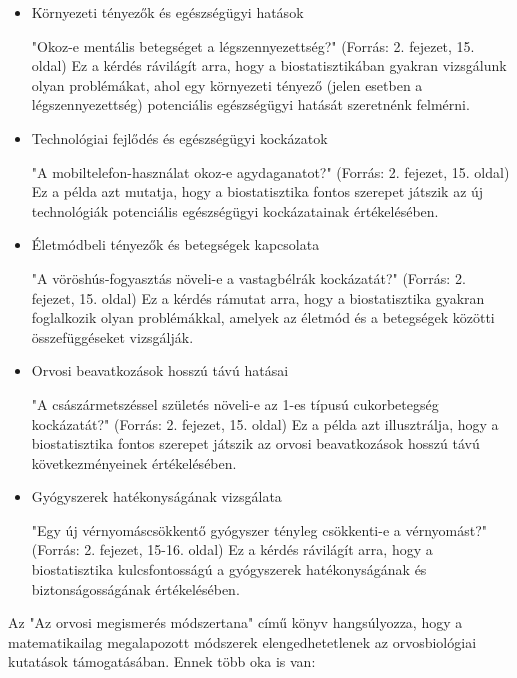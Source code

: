 \documentclass[a4paper,12pt]{article}
\begin{document}
    \begin{itemize}
        \item Környezeti tényezők és egészségügyi hatások

        "Okoz-e mentális betegséget a légszennyezettség?" (Forrás: 2. fejezet, 15. oldal) Ez a kérdés rávilágít arra, hogy a biostatisztikában gyakran vizsgálunk olyan problémákat, ahol egy környezeti tényező (jelen esetben a légszennyezettség) potenciális egészségügyi hatását szeretnénk felmérni.

        \item Technológiai fejlődés és egészségügyi kockázatok

        "A mobiltelefon-használat okoz-e agydaganatot?" (Forrás: 2. fejezet, 15. oldal) Ez a példa azt mutatja, hogy a biostatisztika fontos szerepet játszik az új technológiák potenciális egészségügyi kockázatainak értékelésében.

        \item Életmódbeli tényezők és betegségek kapcsolata

        "A vöröshús-fogyasztás növeli-e a vastagbélrák kockázatát?" (Forrás: 2. fejezet, 15. oldal) Ez a kérdés rámutat arra, hogy a biostatisztika gyakran foglalkozik olyan problémákkal, amelyek az életmód és a betegségek közötti összefüggéseket vizsgálják.

        \item Orvosi beavatkozások hosszú távú hatásai

        "A császármetszéssel születés növeli-e az 1-es típusú cukorbetegség kockázatát?" (Forrás: 2. fejezet, 15. oldal) Ez a példa azt illusztrálja, hogy a biostatisztika fontos szerepet játszik az orvosi beavatkozások hosszú távú következményeinek értékelésében.


        \item Gyógyszerek hatékonyságának vizsgálata

        "Egy új vérnyomáscsökkentő gyógyszer tényleg csökkenti-e a vérnyomást?" (Forrás: 2. fejezet, 15-16. oldal) Ez a kérdés rávilágít arra, hogy a biostatisztika kulcsfontosságú a gyógyszerek hatékonyságának és biztonságosságának értékelésében.

    \end{itemize}

    Az "Az orvosi megismerés módszertana" című könyv hangsúlyozza, hogy a matematikailag megalapozott módszerek elengedhetetlenek az orvosbiológiai kutatások támogatásában. Ennek több oka is van:
\end{document}
